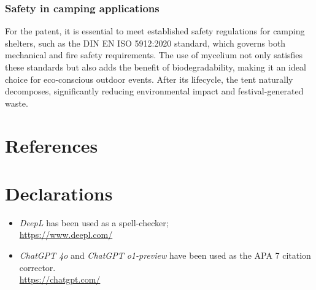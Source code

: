 \documentclass{article}
\begin{document}

\subsubsection{Safety in camping applications}

For the patent, it is essential to meet established safety regulations for camping
shelters, such as the DIN EN ISO 5912:2020 standard, which governs both mechanical and
fire safety requirements. The use of mycelium not only satisfies these standards but also
adds the benefit of biodegradability, making it an ideal choice for eco-conscious outdoor
events. After its lifecycle, the tent naturally decomposes, significantly reducing
environmental impact and festival-generated waste.\\


\newpage
\section{References}
\setlength{\bibitemsep}{1.2\baselineskip}
\printbibliography[heading=none]
\vfill

\section{Declarations}
\begin{itemize}
    \item \textit{DeepL} has been used as a spell-checker;\\
        \url{https://www.deepl.com/}
    \item \textit{ChatGPT 4o} and \textit{ChatGPT o1-preview} have been used as the APA 7 citation corrector.\\
        \url{https://chatgpt.com/}
\end{itemize}
\end{document}

